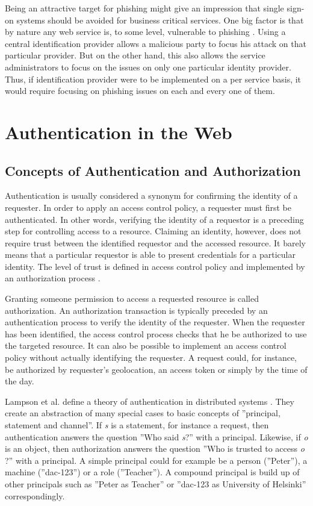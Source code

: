 \documentclass{tktltiki}
\begin{document}
    Being an attractive target for phishing might give an impression that single sign-on systems should be avoided for business critical services. One big factor is that by nature any web service is, to some level, vulnerable to phishing \cite{why_phishing_works_06}. Using a central identification provider allows a malicious party to focus his attack on that particular provider. But on the other hand, this also allows the service administrators to focus on the issues on only one particular identity provider. Thus, if identification provider were to be implemented on a per service basis, it would require focusing on phishing issues on each and every one of them.

      
    
\section{Authentication in the Web}



\subsection{Concepts of Authentication and Authorization}

    Authentication is usually considered a synonym for confirming the identity of a requester. In order to apply an access control policy, a requester must first be authenticated. In other words, verifying the identity of a requestor is a preceding step for controlling access to a resource. Claiming an identity, however, does not require trust between the identified requestor and the accessed resource. It barely means that a particular requestor is able to present credentials for a particular identity. The level of trust is defined in access control policy and implemented by an authorization process \cite{lampson_distributed_1992}.

  Granting someone permission to access a requested resource is called authorization. An authorization transaction is typically preceded by an authentication process to verify the identity of the requester. When the requester has been identified, the access control process checks that he be authorized to use the targeted resource. It can also be possible to implement an access control policy without actually identifying the requester. A request could, for instance, be authorized by requester's geolocation, an access token or simply by the time of the day.
          
  Lampson et al. define a theory of authentication in distributed systems
\cite{lampson_distributed_1992}. They create an abstraction of many special
cases to basic concepts of ''principal, statement and channel''. If \emph{s}
is a statement, for instance a request, then authentication answers the
question ''Who said \emph{s}?'' with a principal. Likewise, if \emph{o} is an
object, then authorization answers the question ''Who is trusted to access
\emph{o} ?'' with a principal. A simple principal could for example be a
person (''Peter''), a machine (''dac-123'') or a role (''Teacher''). A
compound principal is build up of other principals such as ''Peter as
Teacher'' or ''dac-123 as University of Helsinki'' correspondingly.
\end{document}
